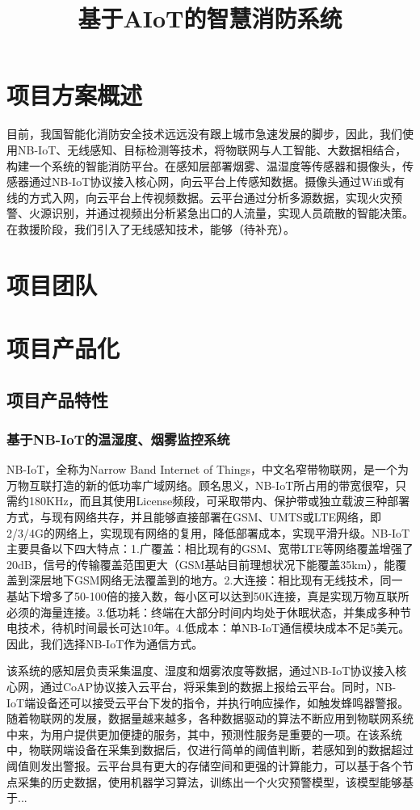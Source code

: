 \documentclass{ctexart}
\begin{document}
	\title{基于AIoT的智慧消防系统}
	\section{项目方案概述}
	目前，我国智能化消防安全技术远远没有跟上城市急速发展的脚步，因此，我们使用NB-IoT、无线感知、目标检测等技术，将物联网与人工智能、大数据相结合，构建一个系统的智能消防平台。在感知层部署烟雾、温湿度等传感器和摄像头，传感器通过NB-IoT协议接入核心网，向云平台上传感知数据。摄像头通过Wifi或有线的方式入网，向云平台上传视频数据。云平台通过分析多源数据，实现火灾预警、火源识别，并通过视频出分析紧急出口的人流量，实现人员疏散的智能决策。在救援阶段，我们引入了无线感知技术，能够（待补充）。
	\section{项目团队}
	\section{项目产品化}
	\subsection{项目产品特性}
	\subsubsection{基于NB-IoT的温湿度、烟雾监控系统}
	NB-IoT，全称为Narrow Band Internet of Things，中文名窄带物联网，是一个为万物互联打造的新的低功率广域网络。顾名思义，NB-IoT所占用的带宽很窄，只需约180KHz，而且其使用License频段，可采取带内、保护带或独立载波三种部署方式，与现有网络共存，并且能够直接部署在GSM、UMTS或LTE网络，即2/3/4G的网络上，实现现有网络的复用，降低部署成本，实现平滑升级。NB-IoT主要具备以下四大特点：1.广覆盖：相比现有的GSM、宽带LTE等网络覆盖增强了20dB，信号的传输覆盖范围更大（GSM基站目前理想状况下能覆盖35km），能覆盖到深层地下GSM网络无法覆盖到的地方。2.大连接：相比现有无线技术，同一基站下增多了50-100倍的接入数，每小区可以达到50K连接，真是实现万物互联所必须的海量连接。3.低功耗：终端在大部分时间内均处于休眠状态，并集成多种节电技术，待机时间最长可达10年。4.低成本：单NB-IoT通信模块成本不足5美元。因此，我们选择NB-IoT作为通信方式。\par
	该系统的感知层负责采集温度、湿度和烟雾浓度等数据，通过NB-IoT协议接入核心网，通过CoAP协议接入云平台，将采集到的数据上报给云平台。同时，NB-IoT端设备还可以接受云平台下发的指令，并执行响应操作，如触发蜂鸣器警报。
	随着物联网的发展，数据量越来越多，各种数据驱动的算法不断应用到物联网系统中来，为用户提供更加便捷的服务，其中，预测性服务是重要的一项。在该系统中，物联网端设备在采集到数据后，仅进行简单的阈值判断，若感知到的数据超过阈值则发出警报。云平台具有更大的存储空间和更强的计算能力，可以基于各个节点采集的历史数据，使用机器学习算法，训练出一个火灾预警模型，该模型能够基于... \par
\end{document}
